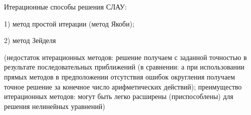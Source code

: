 Итерационные способы решения СЛАУ:

1) метод простой итерации (метод Якоби);

2) метод Зейделя

(недостаток итерационных методов: решение получаем с заданной точностью в результате последовательных приближений (в сравнении: а при использовании прямых методов в предположении отсутствия ошибок округления получаем точное решение за конечное число арифметических действий); преимущество итерационных методов: могут быть легко расширены (приспособлены) для решения нелинейных уравнений)






